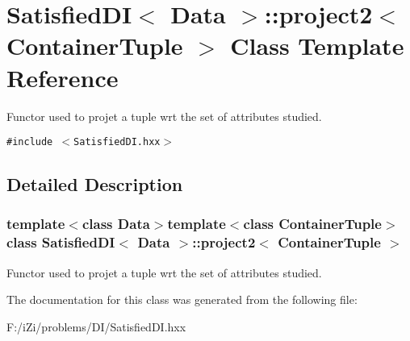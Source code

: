 \section{Satisfied\-DI$<$ Data $>$::project2$<$ Container\-Tuple $>$ Class Template Reference}
\label{class_satisfied_d_i_1_1project2}
Functor used to projet a tuple wrt the set of attributes studied.  


{\tt \#include $<$Satisfied\-DI.hxx$>$}



\subsection{Detailed Description}
\subsubsection*{template$<$class Data$>$template$<$class Container\-Tuple$>$ class Satisfied\-DI$<$ Data $>$::project2$<$ Container\-Tuple $>$}

Functor used to projet a tuple wrt the set of attributes studied. 



The documentation for this class was generated from the following file:\begin{CompactItemize}
\item 
F:/i\-Zi/problems/DI/Satisfied\-DI.hxx\end{CompactItemize}
